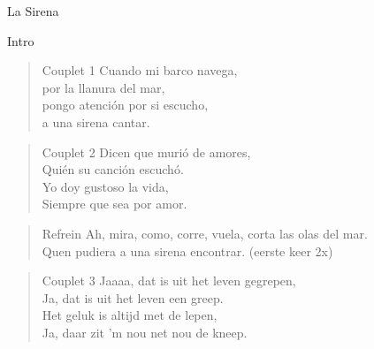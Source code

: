 \begin{song}[vals]{La Sirena}

\begin{instrumental}{Intro}
 \measure{}\measure{} 
  \measure{}\measure{} 
 \measure{}\measure{} 
     
\end{instrumental}

\begin{verse}{Couplet 1}
Cuando mi barco navega,\\ 
por la llanura del mar,\\ 
\chord{}pongo atención por si escucho,\\ 
a una sirena cantar.\\ 
\end{verse}

\begin{verse}{Couplet 2}
Dicen que murió de amores,\\ 
Quién su canción escuchó. \\
\chord{}Yo doy gustoso la vida, \\
Siempre que sea por amor. \\
\end{verse}

\begin{verse}{Refrein}
Ah, mira, como,  corre, vuela, corta las olas del mar.\\
Quen pudiera a una sirena encontrar. \hspace{5em} (eerste keer 2x)
\end{verse}

\begin{verse}{Couplet 3}
Jaaaa, dat is uit het leven gegrepen,\\
Ja, dat is uit het leven een greep.\hspace{1.5em}\\
Het geluk is altijd met de lepen,\\
Ja, daar zit 'm nou net nou de kneep.\hspace{1.5em}
\end{verse}


\end{song}

